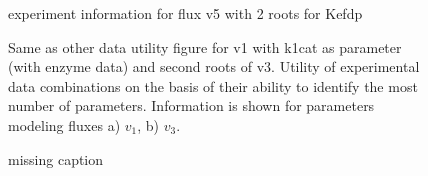 \documentclass[10pt]{article}
\begin{document}
	\begin{figure}[!tbhp]
		\caption{experiment information for flux v5 with 2 roots for Kefdp}\label{fig:v5_exp_info}
	\end{figure}

	\begin{figure}[!tbhp]
		\caption{Same as other data utility figure for v1 with k1cat as parameter (with enzyme data) and second roots of v3. Utility of experimental data combinations on the basis of their ability to identify the most number of parameters. Information is shown for parameters modeling fluxes a) $v_1$, b) $v_3$.}\label{fig:other_data_utility}
	\end{figure}		

	\begin{figure}[!tbhp]
		\caption{missing caption}%
	\end{figure} 	
\end{document}
